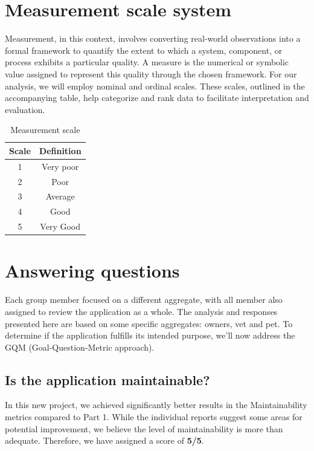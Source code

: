\documentclass[a4paper,11pt,openright,BCOR=15mm]{scrbook}
\begin{document}
	\pagebreak
	
	\section{Measurement scale system}
	
	Measurement, in this context, involves converting real-world observations into a formal framework to quantify the extent to which a system, component, or process exhibits a particular quality. A measure is the numerical or symbolic value assigned to represent this quality through the chosen framework. For our analysis, we will employ nominal and ordinal scales. These scales, outlined in the accompanying table, help categorize and rank data to facilitate interpretation and evaluation.
		
	\begin{table}[H]
		\centering
		\begin{tabular}{|c|c|} \hline 
			Scale& Definition\\ \hline 
			1& Very poor\\ \hline 
			2& Poor\\ \hline 
			3& Average\\ \hline 
			4& Good\\ \hline 
			5& Very Good\\ \hline
		\end{tabular}
		\caption{Measurement scale}
		\label{tab:table-scale}
	\end{table}
	
	\section{Answering questions}
	
	Each group member focused on a different aggregate, with all member also assigned to review the application as a whole. The analysis and responses presented here are based on some specific aggregates: owners, vet and pet. To determine if the application fulfills its intended purpose, we’ll now address the GQM (Goal-Question-Metric approach).
	
	\subsection{Is the application maintainable?}				
	In this new project, we achieved significantly better results in the Maintainability metrics compared to Part 1. While the individual reports suggest some areas for potential improvement, we believe the level of maintainability is more than adequate. Therefore, we have assigned a score of \textbf{5/5}.
	
\end{document}
